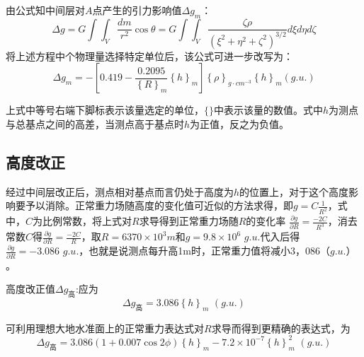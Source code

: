 由公式知中间层对$A$点产生的引力影响值$\varDelta g_m$：
\begin{equation}
	\varDelta g=G\int{\int_V{\frac{dm}{r^2}\cos \theta}=G\int{\int_V{\frac{\zeta \rho}{\left( \xi ^2+\eta ^2+\zeta ^2 \right) ^{\text{3/}2}}d\xi d\eta d\zeta}}}
\end{equation}
将上述方程中个物理量选择特定单位后，该公式可进一步改写为：
\begin{equation}
	\varDelta g_m=-\left[ 0.419-\frac{0.2095}{\left\{ R \right\} _m}\left\{ h \right\} _m \right] \left\{ \rho \right\} _{g\cdot cm^{-3}}\left\{ h \right\} _m\left( g.u. \right) 
\end{equation}

上式中等号右端下脚标表示该量选定的单位，$\{\}$中表示该量的数值。式中$h$为测点与总基点之间的高差，当测点高于基点时$h$为正值，反之为负值。
\subsection{高度改正}
经过中间层改正后，测点相对基点而言仍处于高度为$h$的位置上，对于这个高度影响要予以消除。正常重力场随高度的变化值可近似的方法求得，即$g=C\frac{1}{R^2}$，式中，$C$为比例常数，将上式对$R$求导得到正常重力场随$R$的变化率 $\frac{\partial g}{\partial R}=\frac{-2C}{R^3}$，消去常数$C$得$\frac{\partial g}{\partial R}=\frac{-2C}{R}$，取$R=6370\times 10^3m
$和$g=9.8\times 10^6\,\,g.u.
$代入后得$\frac{\partial g}{\partial R}=-\text{3.086 }g.u.
$，也就是说测点每升高1m时，正常重力值将减小$3，086（g.u.）$。

高度改正值$\varDelta g_{\text{高}}$:应为
\begin{equation}
	\varDelta g_{\text{高}}=3.086\left\{ h \right\} _m\,\,\left( g.u. \right) 
\end{equation}

可利用理想大地水准面上的正常重力表达式对$R$求导而得到更精确的表达式，为
\begin{equation}
	\varDelta g_{\text{高}}=3.086\left( 1+\text{0.007}\cos 2\phi \right) \left\{ h \right\} _m-7.2\times 10^{-7}\left\{ h \right\} _{m}^{2}\,\,\left( g.u. \right) 
\end{equation}